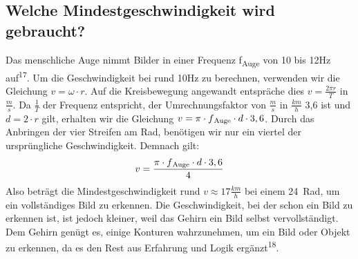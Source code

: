 \documentclass [a4paper, 11pt] {article}
\begin{document}
\subsection{Welche Mindestgeschwindigkeit wird gebraucht?}
Das menschliche Auge nimmt Bilder in einer Frequenz f\textsubscript{Auge} von 10 bis 12Hz auf\textsuperscript{17}. Um die Geschwindigkeit bei rund 10Hz zu berechnen, verwenden wir die Gleichung $v = \omega \cdot r$. Auf die Kreisbewegung angewandt entspräche dies $v = \frac{2\pi r}{T}$ in $\frac{m}{s}$. Da $\frac{1}{T}$ der Frequenz entspricht, der Umrechnungsfaktor von $\frac{m}{s}$ in $\frac{km}{h}$ 3,6 ist und $d = 2 \cdot r$ gilt, erhalten wir die Gleichung $v = \pi \cdot f\textsubscript{Auge} \cdot d \cdot 3,6$. Durch das Anbringen der vier Streifen am Rad, benötigen wir nur ein viertel der ursprüngliche Geschwindigkeit. Demnach gilt: 
\begin{align}
v = \frac{\pi \cdot f\textsubscript{Auge} \cdot d \cdot 3,6}{4}
\end{align}
Also beträgt die Mindestgeschwindigkeit rund $v \approx 17\frac{km}{h}$ bei einem 24\grqq\ Rad, um ein vollständiges Bild zu erkennen. Die Geschwindigkeit, bei der schon ein Bild zu erkennen ist, ist jedoch kleiner, weil das Gehirn ein Bild selbst vervollständigt. Dem Gehirn genügt es, einige Konturen wahrzunehmen, um ein Bild oder Objekt zu erkennen, da es den Rest aus Erfahrung und Logik ergänzt\textsuperscript{18}.
\end{document}
